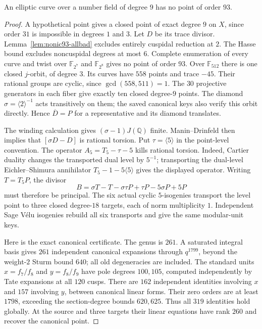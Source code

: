 \begin{proposition}\label{prop:nonic93-exclusion}
An elliptic curve over a number field of degree $9$ has no point of
order $93$.
\end{proposition}
\begin{proof}
A hypothetical point gives a closed point of exact degree $9$ on $X$,
since order $31$ is impossible in degrees $1$ and $3$.
Let $D$ be its trace divisor. Lemma~\ref{lem:nonic93-allbad} excludes
entirely cuspidal reduction at $2$.
The Hasse bound excludes noncuspidal degrees at most $6$.
Complete enumeration of every curve and twist over
$\mathbb F_{2^7}$ and $\mathbb F_{2^8}$ gives no point of order $93$.
Over $\mathbb F_{512}$ there is one closed $j$-orbit, of degree $3$.
Its curves have $558$ points and trace $-45$. Their rational groups
are cyclic, since $\gcd(558,511)=1$. The $30$ projective generators
in each fiber give exactly ten closed degree-$9$ points.
The diamond $\sigma=\langle2\rangle^{-1}$ acts transitively on them;
the saved canonical keys also verify this orbit directly.
Hence $\overline D=P$ for a representative and its diamond translates.

The winding calculation gives $(\sigma-1)J(\mathbb Q)$ finite.
Manin--Drinfeld then implies that $[\sigma D-D]$ is rational torsion.
Put $\tau=\langle5\rangle$ in the point-level convention.
The operator $A_5=T_5-\tau-5$ kills rational torsion.
Indeed, Cartier duality changes the transported dual level by
$5^{-1}$; transporting the dual-level Eichler--Shimura annihilator
$T_5-1-5\langle5\rangle$ gives the displayed operator.
Writing $T=T_5P$, the divisor
\[
 B=\sigma T-T-\sigma\tau P+\tau P-5\sigma P+5P
\]
must therefore be principal. The six actual cyclic $5$-isogenies
transport the level point to three closed degree-$18$ targets, each
of norm multiplicity $1$. Independent Sage V\'elu isogenies rebuild
all six transports and give the same modular-unit keys.

Here is the exact canonical certificate. The genus is $261$.
A saturated integral basis gives $261$ independent canonical
expansions through $q^{1799}$, beyond the weight-$2$ Sturm bound $640$;
all old degeneracies are included. The standard units $x=f_7/f_8$ and
$y=f_8/f_9$ have pole degrees $100,105$, computed independently by
Tate expansions at all $120$ cusps. There are $162$ independent
identities involving $x$ and $157$ involving $y$, between canonical
linear forms. Their zero orders are at least $1798$, exceeding the
section-degree bounds $620,625$. Thus all $319$ identities hold globally.
At the source and three targets their linear equations have rank $260$
and recover the canonical point.


\end{proof}

